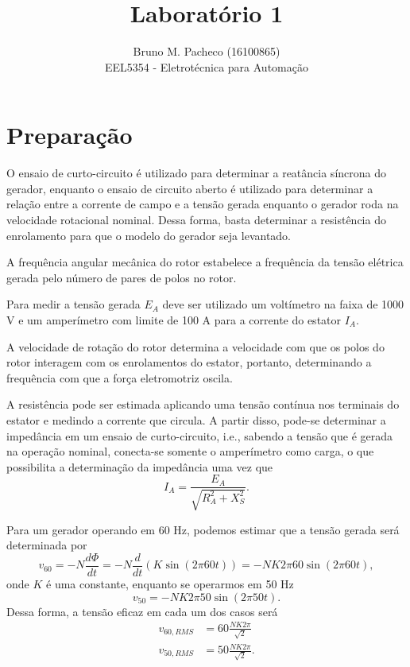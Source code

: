 \documentclass[a4paper]{report}
\begin{document}
 
\title{Laboratório 1}
\author{Bruno M. Pacheco (16100865)\\
EEL5354 - Eletrotécnica para Automação}
 
\maketitle
 
\section*{Preparação}


O ensaio de curto-circuito é utilizado para determinar a reatância síncrona do gerador, enquanto o ensaio de circuito aberto é utilizado para determinar a relação entre a corrente de campo e a tensão gerada enquanto o gerador roda na velocidade rotacional nominal. Dessa forma, basta determinar a resistência do enrolamento para que o modelo do gerador seja levantado.


A frequência angular mecânica do rotor estabelece a frequência da tensão elétrica gerada pelo número de pares de polos no rotor.


Para medir a tensão gerada $E_A$ deve ser utilizado um voltímetro na faixa de 1000 V e um amperímetro com limite de 100 A para a corrente do estator $I_A$.


A velocidade de rotação do rotor determina a velocidade com que os polos do rotor interagem com os enrolamentos do estator, portanto, determinando a frequência com que a força eletromotriz oscila.


A resistência pode ser estimada aplicando uma tensão contínua nos terminais do estator e medindo a corrente que circula. A partir disso, pode-se determinar a impedância em um ensaio de curto-circuito, i.e., sabendo a tensão que é gerada na operação nominal, conecta-se somente o amperímetro como carga, o que possibilita a determinação da impedância uma vez que \[
I_A = \frac{E_A}{\sqrt{R_A^2 + X_S^2} }
.\] 


Para um gerador operando em 60 Hz, podemos estimar que a tensão gerada será determinada por \[
v_{60} = -N \frac{d \Phi}{d t} = -N \frac{d}{d t}\left( K \sin\left( 2 \pi 60 t \right)  \right) = -N K 2\pi 60 \sin\left( 2\pi 60 t \right) 
,\] onde $K$ é uma constante, enquanto se operarmos em 50 Hz \[
v_{50} = -N K 2\pi 50 \sin\left( 2\pi 50 t \right) 
.\] Dessa forma, a tensão eficaz em cada um dos casos será
\begin{align*}
    v_{60,RMS} &= 60\frac{ N K 2\pi }{\sqrt{2} }  \\
    v_{50,RMS} &= 50\frac{ N K 2\pi }{\sqrt{2} }
.\end{align*}
\end{document}
